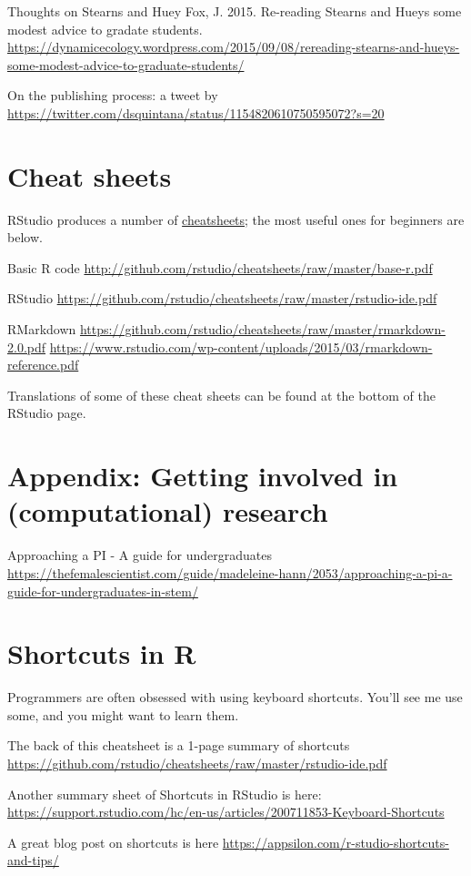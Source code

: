 \documentclass[
]{book}
\begin{document}
Thoughts on Stearns and Huey
Fox, J. 2015. Re-reading Stearns and Hueys some modest advice to gradate students.
\url{https://dynamicecology.wordpress.com/2015/09/08/rereading-stearns-and-hueys-some-modest-advice-to-graduate-students/}

On the publishing process: a tweet by \citet{dsquintana}
\url{https://twitter.com/dsquintana/status/1154820610750595072?s=20}

\hypertarget{cheat-sheets}{%
\chapter{Cheat sheets}\label{cheat-sheets}}

RStudio produces a number of \href{https://www.rstudio.com/resources/cheatsheets/\#ide}{cheatsheets}; the most useful ones for beginners are below.

Basic R code
\url{http://github.com/rstudio/cheatsheets/raw/master/base-r.pdf}

RStudio
\url{https://github.com/rstudio/cheatsheets/raw/master/rstudio-ide.pdf}

RMarkdown
\url{https://github.com/rstudio/cheatsheets/raw/master/rmarkdown-2.0.pdf}
\url{https://www.rstudio.com/wp-content/uploads/2015/03/rmarkdown-reference.pdf}

Translations of some of these cheat sheets can be found at the bottom of the RStudio page.

\hypertarget{appendix-getting-involved-in-computational-research}{%
\chapter{Appendix: Getting involved in (computational) research}\label{appendix-getting-involved-in-computational-research}}

Approaching a PI - A guide for undergraduates \url{https://thefemalescientist.com/guide/madeleine-hann/2053/approaching-a-pi-a-guide-for-undergraduates-in-stem/}

\hypertarget{shortcuts-in-r}{%
\chapter{Shortcuts in R}\label{shortcuts-in-r}}

Programmers are often obsessed with using keyboard shortcuts. You'll see me use some, and you might want to learn them.

The back of this cheatsheet is a 1-page summary of shortcuts
\url{https://github.com/rstudio/cheatsheets/raw/master/rstudio-ide.pdf}

Another summary sheet of Shortcuts in RStudio is here:
\url{https://support.rstudio.com/hc/en-us/articles/200711853-Keyboard-Shortcuts}

A great blog post on shortcuts is here
\url{https://appsilon.com/r-studio-shortcuts-and-tips/}
\end{document}
